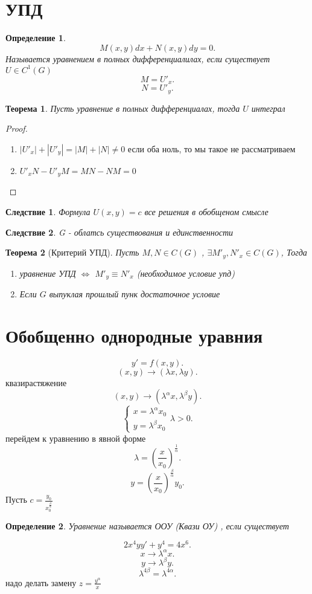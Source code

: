 \documentclass[14pt]{extarticle}
\newtheorem{theorem}{Теорема}
\newtheorem{definition}{Определение}
\newtheorem{corollary}{Следствие}[theorem]
\begin{document}
\section{УПД}
\begin{definition}
	\[
		M(x,y) dx + N(x,y) dy = 0
		.\]
	Называется уравнением в полных дифференциалилах, если существует $U \in C^{1}(G)$
	\[
		M = U'_{x}
		.\]
	\[
		N = U'_{y}
		.\]
\end{definition}
\begin{theorem}
	Пусть уравнение в полных дифференциалах, тогда $U$ интеграл
\end{theorem}
\begin{proof}
	\begin{enumerate}
		\item $|U'_{x}| + |U'_{y}|  = |M| + |N| \neq 0$ если оба ноль, то мы такое не рассматриваем
		\item
		      $U'_{x} N - U'_{y} M = M N - N M = 0$
	\end{enumerate}
\end{proof}
\begin{corollary}
	Формула $U(x,y) = c$ все решения в обобщеном смысле
\end{corollary}
\begin{corollary}
	G - облатсь существования и единственности
\end{corollary}
\begin{theorem}[Критерий УПД]
	Пусть $M,N \in C(G)$ ,  $\exists M'_{y}, N'_{x} \in C(G)$, Тогда
	\begin{enumerate}
		\item уравнение УПД $\iff$  $M'_{y} \equiv N'_{x}$ (необходимое условие упд)
		\item Если $G$ выпуклая прошлый пунк достаточное условие
	\end{enumerate}
\end{theorem}
\section{Обобщеннo однородные уравния}
\[
	y' = f(x,y)
	.\]
\[
	(x,y) \to (\lambda x, \lambda y)
	.\]
квазирастяжение
\[
	(x,y) \to (\lambda^{\alpha}  x , \lambda^{\beta} y)
	.\]
\[
	\begin{cases}
		x = \lambda^{\alpha} x_0 \\
		y = \lambda^{\beta} x_0
	\end{cases}
	\lambda > 0
	.\]
перейдем к уравнению в явной форме
\[
	\lambda = (\frac{x}{x_0})^{\frac{1}{\alpha}}
	.\]
\[
	y = (\frac{x}{x_0})^{\frac{\beta}{\alpha}} y_0
	.\]
Пусть $c = \frac{y_0}{x_0^{\frac{\beta}{\alpha}}}$
\begin{definition}
	Уравнение называется ООУ (Квази ОУ) , если существует
\end{definition}
\[
	2x^4 y y' + y^{4} = 4x^{6}
	.\]
\[
	x \to \lambda^{\alpha} x
	.\]
\[
	y \to \lambda^{\beta} y
	.\]
\[
	\lambda^{4\beta} = \lambda^{4\alpha}
	.\]
надо делать замену $z = \frac{y^{\alpha}}{x^{}}$
\end{document}
